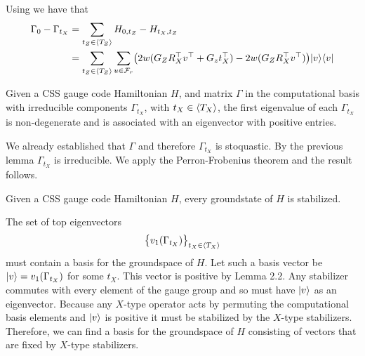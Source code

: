 Using 
we have that 
\begin{align*}
    \Gamma_{0} - \Gamma_{t_X}
    &= \sum_{t_Z\in\langle T_Z \rangle} H_{0,t_Z} - H_{t_X,t_Z} \\
    &= \sum_{t_Z\in\langle T_Z \rangle} \sum_{u\in\mathcal{F}_r}
        \bigl( 2w(G_Z R_X^\top v^\top + G_z t_X^\top)
        - 2w(G_Z R_X^\top v^\top)\bigr)
        |{v}\rangle\langle{v}|
\end{align*}

Given a CSS gauge code Hamiltonian $H$, 
and matrix $\Gamma$ in the computational basis 
with irreducible
components $\Gamma_{t_X}$,
with $t_X\in\langle T_X \rangle$,
the first eigenvalue 
of each $\Gamma_{t_X}$
is non-degenerate
and is associated with an eigenvector 
with positive entries.

\doproof
We already established that $\Gamma$ and therefore
$\Gamma_{t_X}$ is stoquastic.
By the previous lemma $\Gamma_{t_X}$ is irreducible.
We apply the Perron-Frobenius theorem and the result follows.
\tombstone

Given a CSS gauge code Hamiltonian $H$,
every groundstate of $H$ is stabilized.

\doproof
The set of top eigenvectors 
$$
    \bigl\{ v_1(\Gamma_{t_X}) \bigr\}_{t_X\in\langle T_X \rangle}
$$
must contain a basis for the groundspace of $H.$
Let such a basis vector be $|{v}\rangle = v_1(\Gamma_{t_X})$ for some $t_X.$
This vector is positive by Lemma 2.2.
Any stabilizer commutes with
every element of the gauge group and so
must have $|{v}\rangle$ as an eigenvector.
Because any
$X$-type operator acts by permuting the computational basis elements 
and $|{v}\rangle$ is positive it must be stabilized by the
$X$-type stabilizers.
Therefore, we can find a basis for the groundspace of
$H$ consisting of vectors that are fixed by $X$-type
stabilizers.


